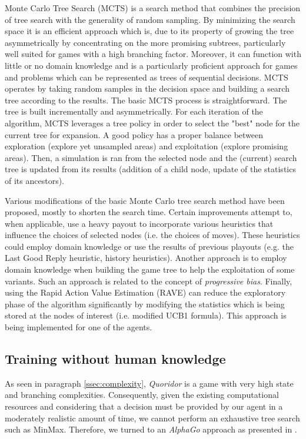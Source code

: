 \documentclass[journal, a4paper]{IEEEtran}
\begin{document}
Monte Carlo Tree Search (MCTS) is a search method that combines the precision of tree search with the generality of random sampling. By minimizing the search space it is an efficient approach which is, due to its property of growing the tree asymmetrically by concentrating on the more promising subtrees, particularly well suited for games with a high branching factor. Moreover, it can function with little or no domain knowledge and is a particularly proficient approach for games and problems which can be represented as trees of sequential decisions. MCTS operates by taking random samples in the decision space and building a search tree according to the results. The basic MCTS process is straightforward. The tree is built incrementally and asymmetrically. For each iteration of the algorithm, MCTS leverages a tree policy in order to select the "best" node for the current tree for expansion. A good policy has a proper balance between exploration (explore yet unsampled areas) and exploitation (explore promising areas). Then, a simulation is ran from the selected node and the (current) search tree is updated from its results (addition of a child node, update of the statistics of its ancestors). 

Various modifications of the basic Monte Carlo tree search method have been proposed, mostly to shorten the search time. Certain improvements attempt to, when applicable, use a heavy payout to incorporate various heuristics that influence the choices of selected nodes (i.e. the choices of moves). These heuristics could employ domain knowledge or use the results of previous playouts (e.g. the Last Good Reply heuristic, history heuristics). Another approach is to employ domain knowledge when building the game tree to help the exploitation of some variants. Such an approach is related to the concept of \textit{progressive bias}. Finally, using the Rapid Action Value Estimation (RAVE) can reduce the exploratory phase of the algorithm significantly by modifying the statistics which is being stored at the nodes of interest (i.e. modified UCB1 formula). This approach is being implemented for one of the agents. 

\subsection{Training without human knowledge}
\label{ssec:human-knowledge}

As seen in paragraph \ref{ssec:complexity}, \textit{Quoridor} is a game with very high state and branching complexities. Consequently, given the existing computational resources and considering that a decision must be provided by our agent in a moderately realistic amount of time, we cannot perform an exhaustive tree search such as MinMax. Therefore, we turned to an \textit{AlphaGo} approach as presented in \cite{alphago}.
\end{document}
